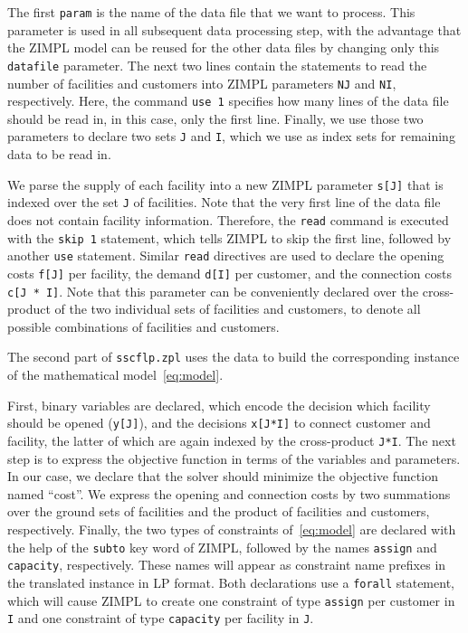 \documentclass[a4paper,10pt]{article}
\begin{document}
The first \texttt{param} is the name of the data file that we want to process.
%
This parameter is used in all subsequent data processing step, with the advantage that the ZIMPL model can be reused for the other data files by changing only this \texttt{datafile} parameter.
%
The next two lines contain the statements to read the number of facilities and customers into ZIMPL parameters \texttt{NJ} and \texttt{NI}, respectively.
%
Here, the command \texttt{use 1} specifies how many lines of the data file should be read in, in this case, only the first line.
%
Finally, we use those two parameters to declare two sets \texttt{J} and \texttt{I}, which we use as index sets for remaining data to be read in.



We parse the supply of each facility into a new ZIMPL parameter \texttt{s[J]} that is indexed over the set \texttt{J} of facilities.
%
Note that the very first line of the data file does not contain facility information.
%
Therefore, the \texttt{read} command is executed with the \texttt{skip 1} statement, which tells ZIMPL to skip the first line, followed by another \texttt{use} statement.
%
Similar \texttt{read} directives are used to declare the opening costs \texttt{f[J]} per facility, the demand \texttt{d[I]} per customer, and the connection costs \texttt{c[J * I]}.
%
Note that this parameter can be conveniently declared over the cross-product of the two individual sets of facilities and customers,
to denote all possible combinations of facilities and customers.
%

The second part of \texttt{sscflp.zpl} uses the data to build the corresponding instance of the mathematical model~\eqref{eq:model}.
%


%
First, binary variables are declared, which encode the decision which facility should be opened (\texttt{y[J]}),
and the decisions \texttt{x[J*I]} to connect customer and facility, the latter of which are again indexed by the cross-product \texttt{J*I}.
%
The next step is to express the objective function in terms of the variables and parameters.
%
In our case, we declare that the solver should minimize the objective function named ``cost''. We express the opening and connection costs by two summations over the ground sets of facilities and the product of facilities and customers, respectively.
%
Finally, the two types of constraints of~\eqref{eq:model} are declared with the help of the \texttt{subto} key word of ZIMPL, followed by the names \texttt{assign} and \texttt{capacity}, respectively.
%
These names will appear as constraint name prefixes in the translated instance in LP format.
%
Both declarations use a \texttt{forall} statement, which will cause ZIMPL to create one constraint of type \texttt{assign} per customer in \texttt{I} and one constraint of type \texttt{capacity} per facility in \texttt{J}.
\end{document}
